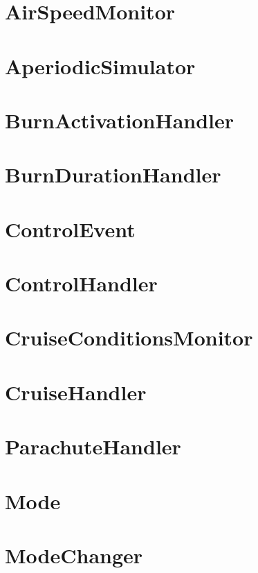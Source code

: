 \documentclass[10pt,a4paper,final]{article}
\begin{document}
\section{AirSpeedMonitor}

\pagebreak

\section{AperiodicSimulator}

\pagebreak

\section{BurnActivationHandler}

\pagebreak

\section{BurnDurationHandler}

\pagebreak

\section{ControlEvent}

\pagebreak

\section{ControlHandler}

\pagebreak

\section{CruiseConditionsMonitor}

\pagebreak


\section{CruiseHandler}

\pagebreak
\section{ParachuteHandler}

\pagebreak

\section{Mode}

\pagebreak

\section{ModeChanger}

\pagebreak
\end{document}
